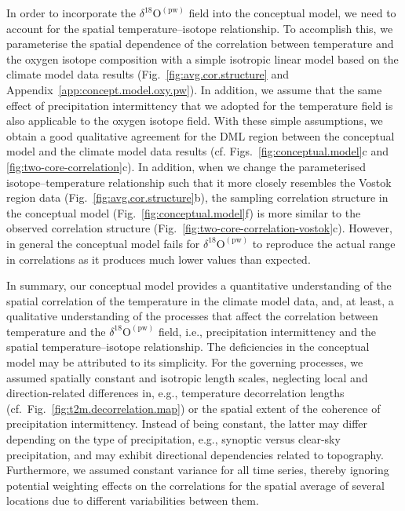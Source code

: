 \documentclass[draft]{agujournal2019}
\begin{document}
In order to incorporate the $\delta^{18}\mathrm{O}^{\mathrm{(pw)}}$ field into
the conceptual model, we need to account for the spatial temperature--isotope
relationship. To accomplish this, we parameterise the spatial dependence of the
correlation between temperature and the oxygen isotope composition with a simple
isotropic linear model based on the climate model data results
(Fig.~\ref{fig:avg.cor.structure} and
Appendix~\ref{app:concept.model.oxy.pw}). In addition, we assume that the same
effect of precipitation intermittency that we adopted for the temperature field
is also applicable to the oxygen isotope field. With these simple assumptions,
we obtain a good qualitative agreement for the DML region between the conceptual
model and the climate model data results (cf. Figs.~\ref{fig:conceptual.model}c
and \ref{fig:two-core-correlation}c). In addition, when we change the
parameterised isotope--temperature relationship such that it more closely
resembles the Vostok region data (Fig.~\ref{fig:avg.cor.structure}b), the
sampling correlation structure in the conceptual model
(Fig.~\ref{fig:conceptual.model}f) is more similar to the observed correlation
structure (Fig.~\ref{fig:two-core-correlation-vostok}c). However, in general the
conceptual model fails for $\delta^{18}\mathrm{O}^{\mathrm{(pw)}}$ to reproduce
the actual range in correlations as it produces much lower values than expected.

In summary, our conceptual model provides a quantitative understanding of the
spatial correlation of the temperature in the climate model data, and, at least,
a qualitative understanding of the processes that affect the correlation between
temperature and the $\delta^{18}\mathrm{O}^{\mathrm{(pw)}}$ field, i.e.,
precipitation intermittency and the spatial temperature--isotope
relationship. The deficiencies in the conceptual model may be attributed to its
simplicity. For the governing processes, we assumed spatially constant and
isotropic length scales, neglecting local and direction-related differences in,
e.g., temperature decorrelation lengths
(cf.~Fig.~\ref{fig:t2m.decorrelation.map}) or the spatial extent of the
coherence of precipitation intermittency. Instead of being constant, the latter
may differ depending on the type of precipitation, e.g., synoptic versus
clear-sky precipitation, and may exhibit directional dependencies related to
topography. Furthermore, we assumed constant variance for all time series,
thereby ignoring potential weighting effects on the correlations for the spatial
average of several locations due to different variabilities between them.
\end{document}
